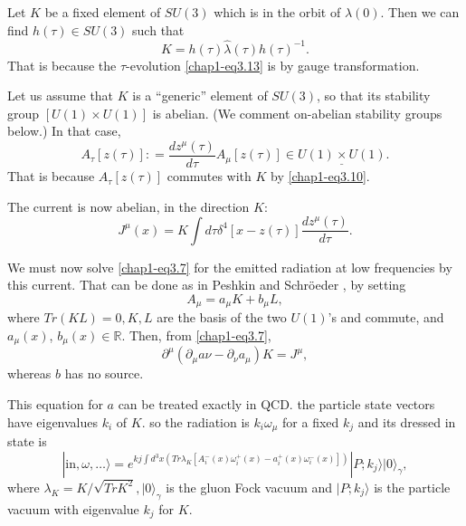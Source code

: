 Let $K$ be a fixed element of \underline{$SU(3)$} which is in the orbit of $\hat{\lambda}(0)$. Then we can find $h (\tau) \in SU(3)$ such that
\begin{equation}
  K= h (\tau) \hat{\lambda} (\tau) h(\tau)^{-1}.\label{chap1-eq3.14}
\end{equation}
That is because the $\tau$-evolution \eqref{chap1-eq3.13} is by gauge transformation.

Let us assume that $K$ is a ``generic'' element of \underline{$SU(3)$}, so that its stability group $[U(1) \times U (1)]$ is abelian. (We comment on-abelian stability groups below.) In that case,
\begin{equation}
A_\tau [z(\tau)]: = \frac{dz^\mu(\tau)}{d\tau} A_\mu [z(\tau)] \in \underline{U(1) \times U(1)}.\label{chap1-eq3.15}
\end{equation}
That is because $A_\tau [z(\tau)]$ commutes with $K$ by \eqref{chap1-eq3.10}.

The current is now abelian, in the direction $K$:
\begin{equation}
J^\mu (x) = K \int d \tau \delta^4 [x-z(\tau)] \frac{dz^\mu(\tau)}{d\tau}. \label{chap1-eq3.16}
\end{equation}

We must now solve \eqref{chap1-eq3.7} for the emitted radiation at low frequencies by this current. That can be done as in Peshkin and Schr\"oeder \cite{key8}, by setting
\begin{equation}
A_\mu = a_\mu K + b_\mu L, \label{chap1-eq3.17}
\end{equation}
where $Tr (KL)=0, K, L$ are the basis of the two \underline{$U(1)$}'s and commute, and $a_\mu(x)$, $b_\mu(x)\in \mathbb{R}$. Then, from \eqref{chap1-eq3.7},
\begin{equation}
\partial^\mu (\partial_\mu a \nu - \partial_\nu a_\mu) K = J^\mu, \label{chap1-eq3.18}
\end{equation}
whereas $b$ has no source.

This equation for $a$ can be treated exactly in QCD. the particle state vectors have eigenvalues $k_i$ of $K$. so the radiation is $k_i \omega_\mu$ for a fixed $k_j$ and its dressed in state is
\begin{equation}
|\text{in}, \omega, \ldots \rangle = e^{kj \int d^3 x (Tr\lambda_K[A_i^- (x) \omega_i^+ (x)- a_i^+ (x) \omega_i^-(x)])} | P; k_j \rangle |0\rangle_\gamma, \label{chap1-eq3.19} 
\end{equation}
where $\lambda_K = K / \sqrt{TrK^2}, |0\rangle_\gamma$ is the gluon Fock vacuum and $|P; k_j \rangle$ is the particle vacuum with eigenvalue $k_j$ for $K$.

